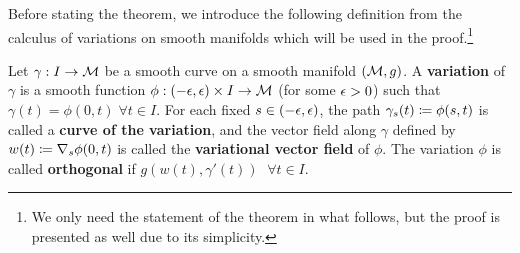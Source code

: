 %
%
%
Before stating the theorem, we introduce the following definition from the calculus of variations on smooth manifolds which will be used in the proof.\footnote{We only need the statement of the theorem in what follows, but the proof is presented as well due to its simplicity.}
\begin{definition}[]\label{def:variation}
Let $\gamma: I \to \mathcal{M}$ be a smooth curve on a smooth manifold $(\mathcal{M}, g)$. A \textbf{variation} of $\gamma$ is a smooth function $\phi: (-\epsilon, \epsilon) \times I \to \mathcal{M}$ (for some $\epsilon>0$) such that $\gamma(t) = \phi(0, t) \; \forall t \in I$. For each fixed $s\in (-\epsilon, \epsilon)$, the path $\gamma_s(t) \coloneqq \phi(s, t)$ is called a \textbf{curve of the variation}, and the vector field along $\gamma$ defined by $w(t) \coloneqq \nabla_s \phi(0, t)$ is called the \textbf{variational vector field} of $\phi$. The variation $\phi$ is called \textbf{orthogonal} if $g(w(t), \gamma'(t))$ $\; \forall t \in I$.
\end{definition}
